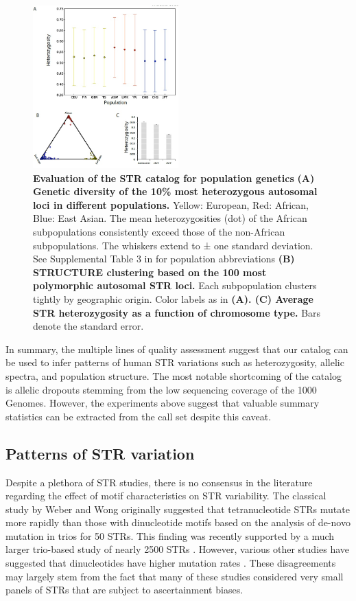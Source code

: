\begin{figure}[h!]
\centering
\label{fig:catfig3}
\includegraphics[width=0.5\textwidth]{Figures/Chapter3/Fig3.jpg}
\caption{\textbf{Evaluation of the STR catalog for population genetics} \textbf{(A) Genetic diversity of the 10\% most heterozygous autosomal loci in different populations.} Yellow: European, Red: African, Blue: East Asian. The mean heterozygosities (dot) of the African subpopulations consistently exceed those of the non-African subpopulations. The whiskers extend to ± one standard deviation. See Supplemental Table 3 in \cite{SuppWillemsGymrekHighnamEtAl2014} for population abbreviations \textbf{(B) STRUCTURE clustering based on the 100 most polymorphic autosomal STR loci.} Each subpopulation clusters tightly by geographic origin. Color labels as in \textbf{(A). (C) Average STR heterozygosity as a function of chromosome type.} Bars denote the standard error.}
\end{figure}

In summary, the multiple lines of quality assessment suggest that our catalog can be used to infer patterns of human STR variations such as heterozygosity, allelic spectra, and population structure. The most notable shortcoming of the catalog is allelic dropouts stemming from the low sequencing coverage of the 1000 Genomes. However, the experiments above suggest that valuable summary statistics can be extracted from the call set despite this caveat. 

\subsection{Patterns of STR variation}
Despite a plethora of STR studies, there is no consensus in the literature regarding the effect of motif characteristics on STR variability. The classical study by Weber and Wong \cite{WeberWong1993} originally suggested that tetranucleotide STRs mutate more rapidly than those with dinucleotide motifs based on the analysis of de-novo mutation in trios for 50 STRs. This finding was recently supported by a much larger trio-based study of nearly 2500 STRs \cite{SunHelgasonMassonEtAl2012}. However, various other studies have suggested that dinucleotides have higher mutation rates \cite{ChakrabortyKimmelStiversEtAl1997,PembertonSandefurJakobssonEtAl2009}. These disagreements may largely stem from the fact that many of these studies considered very small panels of STRs that are subject to ascertainment biases. 

